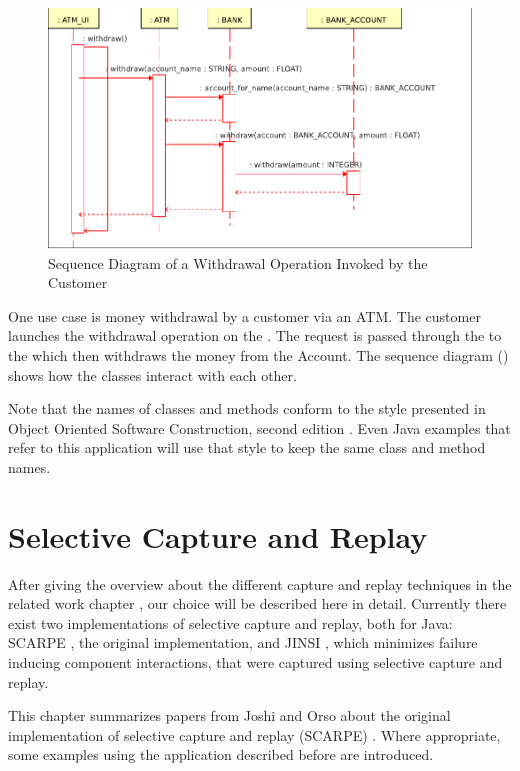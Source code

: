 \begin{figure}[ht]
   \centering
   \includegraphics[width=1\textwidth]{illustrations/example_withdrawal}
   \caption{Sequence Diagram of a Withdrawal Operation Invoked by the Customer}
   \label{fig:example_withdraw_sequence}
\end{figure}

One use case is money withdrawal by a customer via an ATM. The customer launches the withdrawal operation on the . The request is passed through the  to the  which then withdraws the money from the Account. The sequence diagram () shows how the classes interact with each other.

Note that the names of classes and methods conform to the style presented in Object Oriented Software Construction, second edition \cite{oosc2}. Even Java examples that refer to this application will use that style to keep the same class and method names.

\section{Selective Capture and Replay}
After giving the overview about the different capture and replay techniques in the related work chapter	, our choice will be described here in detail. Currently there exist two implementations of selective capture and replay, both for Java: SCARPE \cite{orso05may, orso06}, the original implementation, and JINSI \cite{JINSI}, which minimizes failure inducing component interactions, that were captured using selective capture and replay.

This chapter summarizes papers from Joshi and Orso about the original implementation of selective capture and replay (SCARPE) \cite{orso05may, orso06}. Where appropriate, some examples using the application described before are introduced.

